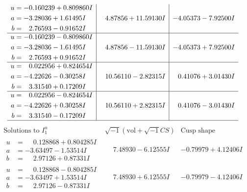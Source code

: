 \documentclass[1p]{elsarticle_modified}
\theoremstyle{definition}
\newcommand{\I}{\sqrt{-1}}
\begin{document}
$$\begin{array}{c|c|c}
\begin{aligned}
u &= -0.160239 + 0.809860 I \\
a &= -3.28036 + 1.61495 I \\
b &= \phantom{-}2.76593 - 0.91652 I\end{aligned}
 & \phantom{-}4.87856 + 11.59130 I & -4.05373 - 7.92500 I \\ \hline\begin{aligned}
u &= -0.160239 - 0.809860 I \\
a &= -3.28036 - 1.61495 I \\
b &= \phantom{-}2.76593 + 0.91652 I\end{aligned}
 & \phantom{-}4.87856 - 11.59130 I & -4.05373 + 7.92500 I \\ \hline\begin{aligned}
u &= \phantom{-}0.022956 + 0.824654 I \\
a &= -4.22626 - 0.30258 I \\
b &= \phantom{-}3.31540 + 0.17209 I\end{aligned}
 & \phantom{-}10.56110 - 2.82315 I & \phantom{-}0.41076 + 3.01430 I \\ \hline\begin{aligned}
u &= \phantom{-}0.022956 - 0.824654 I \\
a &= -4.22626 + 0.30258 I \\
b &= \phantom{-}3.31540 - 0.17209 I\end{aligned}
 & \phantom{-}10.56110 + 2.82315 I & \phantom{-}0.41076 - 3.01430 I\\
 \hline 
 \end{array}$$\newpage$$\begin{array}{c|c|c}  
\text{Solutions to }I^u_{1}& \I (\text{vol} + \sqrt{-1}CS) & \text{Cusp shape}\\
 \hline 
\begin{aligned}
u &= \phantom{-}0.128868 + 0.804285 I \\
a &= -3.63497 - 1.53514 I \\
b &= \phantom{-}2.97126 + 0.87331 I\end{aligned}
 & \phantom{-}7.48930 - 6.12555 I & -0.79979 + 4.12406 I \\ \hline\begin{aligned}
u &= \phantom{-}0.128868 - 0.804285 I \\
a &= -3.63497 + 1.53514 I \\
b &= \phantom{-}2.97126 - 0.87331 I\end{aligned}
 & \phantom{-}7.48930 + 6.12555 I & -0.79979 - 4.12406 I \\ \hline\begin{aligned}

\end{aligned}
\end{array}$$
\end{document}

